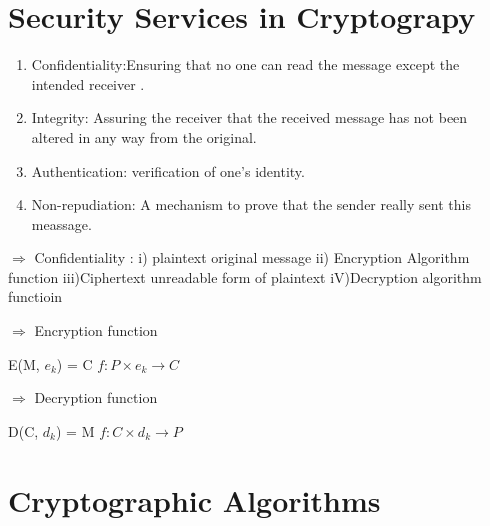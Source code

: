 \documentclass[11pt]{article}
\begin{document}
	
	\section{Security Services in Cryptograpy}
	\begin{enumerate}
		\item Confidentiality:Ensuring that no one can read the message except the intended receiver .
		\item Integrity: Assuring the receiver that the received message has not been altered in any way from the original.
		\item Authentication: verification of one's identity.
		\item Non-repudiation: A mechanism to prove that the sender really sent this meassage.
	\end{enumerate}
	$\Rightarrow$ Confidentiality :\newline
	i) plaintext \rightarrow original message \newline
	ii) Encryption Algorithm \rightarrow function  \newline
	iii)Ciphertext \rightarrow unreadable form of plaintext \newline
	iV)Decryption algorithm \rightarrow functioin  \newline
	
	$\Rightarrow$ Encryption function 
	\begin{center}
		E(M, $e_k$) = C \newline
		$f:P\times e_k\rightarrow C$ \newline
	\end{center}
	$\Rightarrow$ Decryption function 
	\begin{center}
		D(C, $d_k$) = M \newline
		$f:C\times d_k\rightarrow P$ \newline
	\end{center}
	\section{Cryptographic Algorithms}
\end{document}
